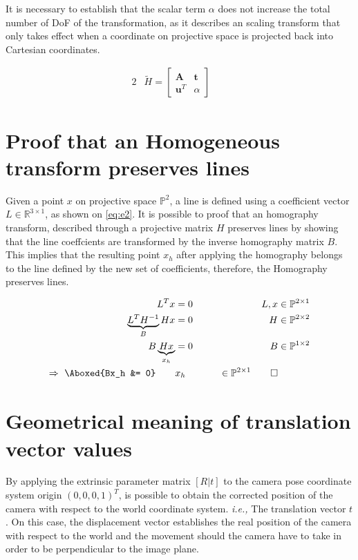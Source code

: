 \documentclass{article}
\begin{document}
It is necessary to establish that the scalar term $\alpha$ does not increase the total number of DoF of the transformation, as it describes an scaling transform that only takes effect when a coordinate on projective space is projected back into Cartesian coordinates.

\begin{alignat}{2}
&\tilde{H} = \begin{bmatrix}
\mathbf{A} & \mathbf{t} \\
\mathbf{u}^{T} & \alpha
\end{bmatrix} & \quad   \label{eq:e1}
\end{alignat}

\section{Proof that an Homogeneous transform preserves lines}
Given a point $x$ on projective space $\mathbb{P}^2$, a line is defined using a coefficient vector $L \in \mathbb{R}^{3 \times 1}$, as shown on \eqref{eq:e2}. It is possible to proof that an homography transform, described through a projective matrix $H$ preserves lines by showing that the line coeffcients are transformed by the inverse homography matrix $B$. This implies that the resulting point $x_{h}$ after applying the homography belongs to the line defined by the new set of coefficients, therefore, the Homography preserves lines.

\begin{alignat}{3}
L^{T}x &= 0 \qquad &L, x &\in \mathbb{P}^{2 \times 1} \label{eq:e2} \\
\nonumber
\underbrace{L^{T}H^{-1}}_{B}Hx &= 0 \qquad &H &\in \mathbb{P}^{2 \times 2} \\
\nonumber
B\underbrace{Hx}_{x_h} &= 0 \qquad &B &\in \mathbb{P}^{1 \times 2} \\
\Rightarrow~ \Aboxed{Bx_h &= 0} \qquad &x_h &\in \mathbb{P}^{2 \times 1} \qed \label{eq:e3}
\end{alignat}


\section{Geometrical meaning of translation vector values}
By applying the extrinsic parameter matrix $[R | t]$ to the camera pose coordinate system origin $(0, 0, 0, 1)^T$, is possible to obtain the corrected position of the camera with respect to the world coordinate system. \textit{i.e.,} The translation vector $t$. On this case, the displacement vector establishes the real position of the camera with respect to the world and the movement should the camera have to take in order to be perpendicular to the image plane.
\end{document}
